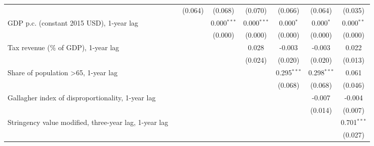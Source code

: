 \begin{table}[htbp]
\begin{tabular}{lccccccc}
                                                                                                &              & (0.064)      & (0.068)        & (0.070)       & (0.066)       & (0.064)       & (0.035)\\   
      GDP p.c. (constant 2015 USD), 1-year lag                                                  &              &              & 0.000$^{***}$  & 0.000$^{***}$ & 0.000$^{*}$   & 0.000$^{*}$   & 0.000$^{**}$\\   
                                                                                                &              &              & (0.000)        & (0.000)       & (0.000)       & (0.000)       & (0.000)\\   
      Tax revenue (\% of GDP), 1-year lag                                                       &              &              &                & 0.028         & -0.003        & -0.003        & 0.022\\   
                                                                                                &              &              &                & (0.024)       & (0.020)       & (0.020)       & (0.013)\\   
      Share of population >65, 1-year lag                                                       &              &              &                &               & 0.295$^{***}$ & 0.298$^{***}$ & 0.061\\   
                                                                                                &              &              &                &               & (0.068)       & (0.068)       & (0.046)\\   
      Gallagher index of disproportionality, 1-year lag                                         &              &              &                &               &               & -0.007        & -0.004\\   
                                                                                                &              &              &                &               &               & (0.014)       & (0.007)\\   
      Stringency value modified, three-year lag, 1-year lag                                     &              &              &                &               &               &               & 0.701$^{***}$\\   
                                                                                                &              &              &                &               &               &               & (0.027)\\   

\end{tabular}
\end{table}
